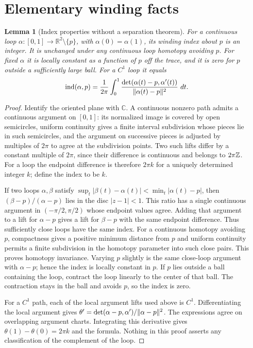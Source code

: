 \documentclass[11pt,oneside]{book}
\newtheorem{lemma}[theorem]{Lemma}
\theoremstyle{definition}
\theoremstyle{remark}\newtheorem{remark}[theorem]{Remark}
\newcommand{\R}{\mathbb R}\newcommand{\C}{\mathbb C}
\newcommand{\dd}{\,d}\newcommand{\id}{\operatorname{id}}
\begin{document}
\section{Elementary winding facts}
\begin{lemma}[Index properties without a separation theorem]\label{d13:21:index-properties}
For a continuous loop $\alpha:[0,1]\to\R^2\setminus\{p\}$,
with $\alpha(0)=\alpha(1)$, its winding index about $p$ is an integer.
It is unchanged under any continuous loop homotopy avoiding $p$.
For fixed $\alpha$ it is locally constant as a function of $p$ off
the trace, and it is zero for $p$ outside a sufficiently large ball.
For a $C^1$ loop it equals
\[
 \operatorname{ind}(\alpha,p)=\frac{1}{2\pi}
 \int_0^1\frac{\det(\alpha(t)-p,\alpha'(t))}
                    {\norm{\alpha(t)-p}^2}\,\dd t.
\]
\end{lemma}
\begin{proof}
Identify the oriented plane with $\C$. A continuous nonzero path admits
a continuous argument on $[0,1]$: its normalized image is covered by
open semicircles, uniform continuity gives a finite interval subdivision
whose pieces lie in such semicircles, and the argument on successive
pieces is adjusted by multiples of $2\pi$ to agree at the subdivision
points. Two such lifts differ by a constant multiple of $2\pi$, since
their difference is continuous and belongs to $2\pi\mathbb Z$. For a loop
the endpoint difference is therefore $2\pi k$ for a uniquely determined
integer $k$; define the index to be $k$.

If two loops $\alpha,\beta$ satisfy
$\sup_t|\beta(t)-\alpha(t)|<\min_t|\alpha(t)-p|$, then
$(\beta-p)/(\alpha-p)$ lies in the disc $|z-1|<1$. This ratio has a
single continuous argument in $(-\pi/2,\pi/2)$ whose endpoint values
agree. Adding that argument to a lift for $\alpha-p$ gives a lift
for $\beta-p$ with the same endpoint difference. Thus sufficiently
close loops have the same index. For a continuous homotopy avoiding
$p$, compactness gives a positive minimum distance from $p$ and uniform
continuity permits a finite subdivision in the homotopy parameter into
such close pairs. This proves homotopy invariance. Varying $p$ slightly
is the same close-loop argument with $\alpha-p$; hence the index is
locally constant in $p$. If $p$ lies outside a ball containing the loop,
contract the loop linearly to the center of that ball. The contraction
stays in the ball and avoids $p$, so the index is zero.

For a $C^1$ path, each of the local argument lifts used above is $C^1$.
Differentiating the local argument gives
$\theta'=\det(\alpha-p,\alpha')/\lVert\alpha-p\rVert^2$.
The expressions agree on overlapping argument charts. Integrating this
derivative gives $\theta(1)-\theta(0)=2\pi k$ and the formula.
Nothing in this proof asserts any classification of the complement of
the loop.
\end{proof}
\end{document}
